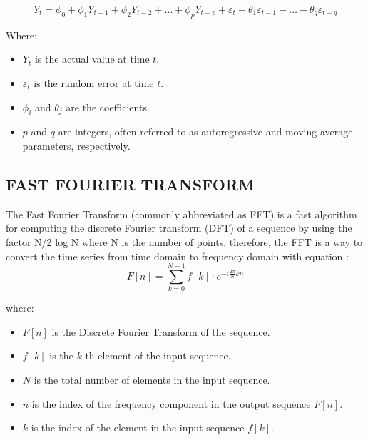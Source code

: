 \documentclass{ieeeojies}
\begin{document}
\begin{equation*}
Y_t = \phi_0 + \phi_1 Y_{t-1} + \phi_2 Y_{t-2} + \ldots + \phi_p Y_{t-p} + \varepsilon_t - \theta_1 \varepsilon_{t-1} - \ldots - \theta_q \varepsilon_{t-q}
\end{equation*}

Where:
\begin{itemize}
    \item $Y_t$ is the actual value at time $t$.
    \item $\varepsilon_t$ is the random error at time $t$.
    \item $\phi_i$ and $\theta_j$ are the coefficients.
    \item $p$ and $q$ are integers, often referred to as autoregressive and moving average parameters, respectively.
\end{itemize}

\subsection{FAST FOURIER TRANSFORM}
The Fast Fourier Transform (commonly abbreviated as
FFT) is a fast algorithm for computing the discrete Fourier
transform (DFT) of a sequence \cite{Gillian} by using the factor N/2
log N where N is the number of points, therefore, the FFT is a
way to convert the time series from time domain to frequency
domain \cite{Musbah} with equation \cite{Roberts}: 
\[
F[n] = \sum_{k=0}^{N-1} f[k] \cdot e^{-i \frac{2\pi}{N} kn}
\]

where:
\begin{itemize}
    \item $F[n]$ is the Discrete Fourier Transform of the sequence.
    \item $f[k]$ is the $k$-th element of the input sequence.
    \item $N$ is the total number of elements in the input sequence.
    \item $n$ is the index of the frequency component in the output sequence $F[n]$.
    \item $k$ is the index of the element in the input sequence $f[k]$.
\end{itemize}

\end{document}

